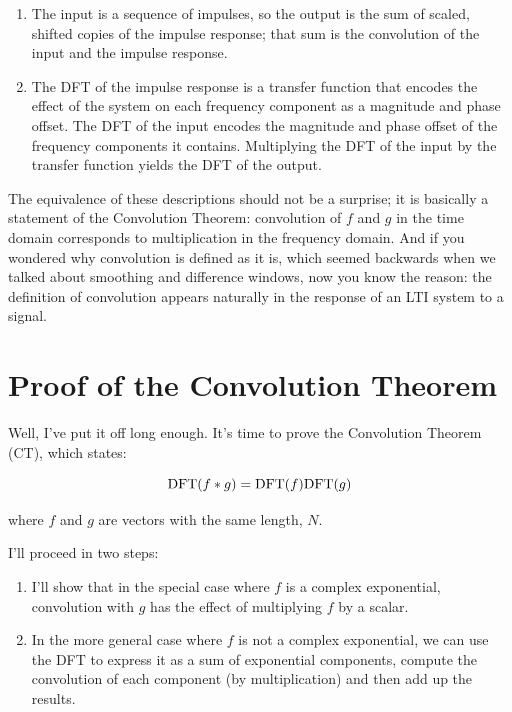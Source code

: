 \documentclass[12pt]{book}
\begin{document}
\begin{enumerate}

\item The input is a sequence of impulses, so the output is the sum of
  scaled, shifted copies of the impulse response; that sum is the
  convolution of the input and the impulse response.

\item The DFT of the impulse response is a transfer function that
  encodes the effect of the system on each frequency component as a
  magnitude and phase offset.  The DFT of the input encodes the
  magnitude and phase offset of the frequency components it contains.
  Multiplying the DFT of the input by the transfer function yields
  the DFT of the output.

\end{enumerate}

The equivalence of these descriptions should not be a surprise;
it is basically a statement of the Convolution Theorem:
convolution of $f$ and $g$ in the time
domain corresponds to multiplication in the frequency domain.
And if you wondered why convolution is defined as it is, which
seemed backwards when we talked about smoothing and difference
windows, now you know the reason: the definition of convolution
appears naturally in the response of an LTI system to a signal.


\section{Proof of the Convolution Theorem}

Well, I've put it off long enough.  It's time to prove the Convolution
Theorem (CT), which states:

\[ \mathrm{DFT}(f \ast g) = \mathrm{DFT}(f) \mathrm{DFT}(g) \]

where $f$ and $g$ are vectors with the same length, $N$.

I'll proceed in two steps:

\begin{enumerate}

\item I'll show that in the special case where $f$ is a complex
exponential, convolution with $g$ has the effect of multiplying
$f$ by a scalar.

\item In the more general case where $f$ is not a complex exponential,
we can use the DFT to express it as a sum of exponential components,
compute the convolution of each component (by multiplication) and
then add up the results.

\end{enumerate}
\end{document}

